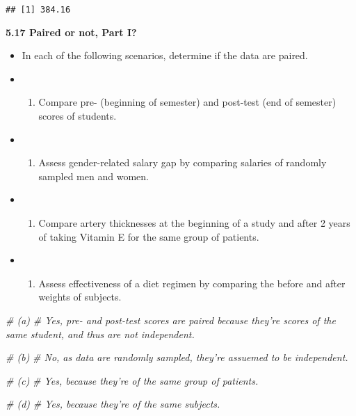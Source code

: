 \documentclass[]{book}
\newenvironment{Shaded}{\begin{snugshade}}{\end{snugshade}}
\newcommand{\CommentTok}[1]{\textcolor[rgb]{0.56,0.35,0.01}{\textit{#1}}}
\providecommand{\tightlist}{%
  \setlength{\itemsep}{0pt}\setlength{\parskip}{0pt}}
\begin{document}
\begin{verbatim}
## [1] 384.16
\end{verbatim}

\textbf{5.17 Paired or not, Part I?}

\begin{itemize}
\item
  In each of the following scenarios, determine if the data are paired.
\item
  \begin{enumerate}
  \def\labelenumi{(\alph{enumi})}
  \tightlist
  \item
    Compare pre- (beginning of semester) and post-test (end of semester) scores of students.
  \end{enumerate}
\item
  \begin{enumerate}
  \def\labelenumi{(\alph{enumi})}
  \setcounter{enumi}{1}
  \tightlist
  \item
    Assess gender-related salary gap by comparing salaries of randomly sampled men and women.
  \end{enumerate}
\item
  \begin{enumerate}
  \def\labelenumi{(\alph{enumi})}
  \setcounter{enumi}{2}
  \tightlist
  \item
    Compare artery thicknesses at the beginning of a study and after 2 years of taking Vitamin E for the same group of patients.
  \end{enumerate}
\item
  \begin{enumerate}
  \def\labelenumi{(\alph{enumi})}
  \setcounter{enumi}{3}
  \tightlist
  \item
    Assess effectiveness of a diet regimen by comparing the before and after weights of subjects.
  \end{enumerate}
\end{itemize}

\begin{Shaded}
\begin{Highlighting}[]
\CommentTok{# (a)}
\CommentTok{# Yes, pre- and post-test scores are paired because they're scores of the same student, and thus are not independent.}

\CommentTok{# (b)}
\CommentTok{# No, as data are randomly sampled, they're assuemed to be independent.}

\CommentTok{# (c)}
\CommentTok{# Yes, because they're of the same group of patients.}

\CommentTok{# (d)}
\CommentTok{# Yes, because they're of the same subjects.}
\end{Highlighting}
\end{Shaded}
\end{document}
